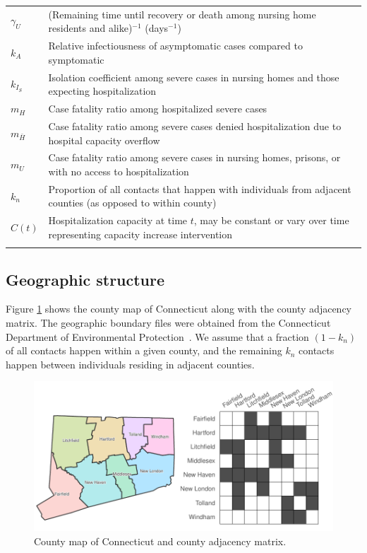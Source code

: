 \documentclass[11pt]{article}
\newcommand{\comments}[1]{[\textcolor{red}{#1}]}
\begin{document}
\begin{longtable} {p{} p{} }
	$\gamma_{U}$ & (Remaining time until recovery or death among nursing home residents and alike)$^{-1}$ (days$^{-1}$) \\[0.5em]
	$k_A$ & Relative infectiousness of asymptomatic cases compared to symptomatic \\[0.5em]
	$k_{I_S}$ & Isolation coefficient among severe cases in nursing homes and those expecting hospitalization \\[0.5em]
	$m_H$ & Case fatality ratio among hospitalized severe cases \\[0.5em]
	$m_{\bar{H}}$ & Case fatality ratio among severe cases denied hospitalization due to hospital capacity overflow \\[0.5em]
	$m_{U}$ & Case fatality ratio among severe cases in nursing homes, prisons, or with no access to hospitalization \\[0.5em]
	$k_n$ & Proportion of all contacts that happen with individuals from adjacent counties (as opposed to within county) \\[0.5em]
	$C(t)$ & Hospitalization capacity at time $t$, may be constant or vary over time representing capacity increase intervention\\
	\hline
	\label{table:params}
\end{longtable}



\subsection{Geographic structure}

Figure \ref{fig:map} shows the county map of Connecticut along with the county adjacency matrix. The geographic boundary files were obtained from the Connecticut Department of Environmental Protection~\citep{shapefile}. We assume that a fraction $(1-k_n)$ of all contacts happen within a given county, and the remaining $k_n$ contacts happen between individuals residing in adjacent counties.

\begin{figure} %
	\centering
	\includegraphics[width=.7\textwidth]{figures/map_adj.pdf}
	\caption{County map of Connecticut and county adjacency matrix.}
	\label{fig:map}
\end{figure}
\end{document}
